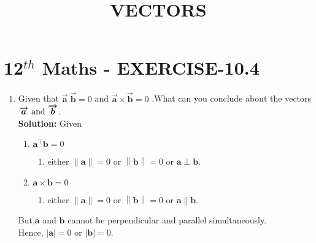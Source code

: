 \documentclass[10pt]{article}
\newcommand{\solution}{\noindent \textbf{Solution: }}
\providecommand{\norm}[1]{\left\lVert#1\right\rVert}
\providecommand{\abs}[1]{\left\vert#1\right\vert}
\let\vec\mathbf{}
\begin{document}
\begin{center}
\title{\textbf{VECTORS}}
\date{\vspace{-5ex}} %
\maketitle
\end{center}

\section{12$^{th}$ Maths - EXERCISE-10.4}

\begin{enumerate}
\item Given that $\boldsymbol{\overrightarrow{a}.\overrightarrow{b}}=0$ and $\boldsymbol{\overrightarrow{a}\times\overrightarrow{b}}=0$ .What can you conclude about the vectors $\boldsymbol{\overrightarrow{a}$ and $\overrightarrow{b}}$.\\  

\solution
Given  

\begin{enumerate}
\item $\vec{a}^{\top}\vec{b}=0$
\begin{enumerate}
\item either $\norm{\vec{a}}=0$ or $\norm{\vec{b}}=0$ or $\vec{a}\perp\vec{b}$.
\end{enumerate}
\item $\vec{a}\times\vec{b}=0$
\begin{enumerate}
\item either $\norm{\vec{a}}=0$ or $\norm{\vec{b}}=0$ or  $\vec{a}\parallel\vec{b}$.
\end{enumerate}
\end{enumerate}
But,$\vec{a}$ and $\vec{b}$ cannot be perpendicular and parallel simultaneously.\\
Hence, $\abs{\vec{a}}=0$ or $\abs{\vec{b}}=0$.

\end{enumerate}
\end{document}
